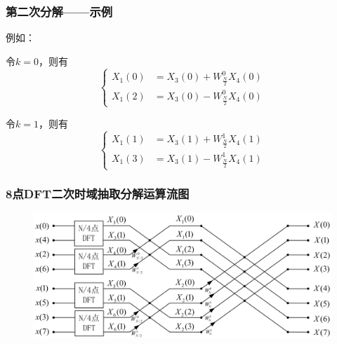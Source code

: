\documentclass[notheorems,compress,mathserif,table]{beamer}
\begin{document}
\begin{frame}[shrink]\frametitle{第二次分解——示例}
例如：
\par 令$k=0$，则有
\begin{equation*} \label{eq:1}
\left\{ \begin{aligned}
         X_1(0) &= X_{3}(0)+  W_{\frac{N}{2}}^{0}X_{4}(0)\\
         X_1(2) &= X_{3}(0)-  W_{\frac{N}{2}}^{0}X_{4}(0)
\end{aligned} \right.
\end{equation*}
\par 令$k=1$，则有
\begin{equation*} \label{eq:1}
\left\{ \begin{aligned}
         X_1(1) &= X_{3}(1)+  W_{\frac{N}{2}}^{1}X_{4}(1)\\
         X_1(3) &= X_{3}(1)-  W_{\frac{N}{2}}^{1}X_{4}(1)
\end{aligned} \right.
\end{equation*}

\end{frame}
\begin{frame}[shrink]\frametitle{8点DFT二次时域抽取分解运算流图}
\begin{figure}[h]
  \centering
  \includegraphics[width=1\textwidth]{8dftSecond.jpg}
\end{figure}
\end{frame}
\end{document}
